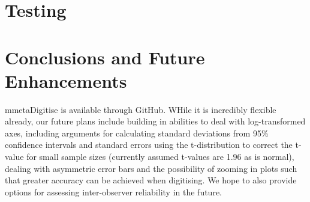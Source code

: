 \documentclass{article}
\begin{document}
\section{Testing}

\section{Conclusions and Future Enhancements}

mmetaDigitise is available through GitHub. WHile it is incredibly flexible already, our future plans include building in abilities to deal with log-transformed axes, including arguments for calculating standard deviations from 95\% confidence intervals and standard errors using the t-distribution to correct the t-value for small sample sizes (currently assumed t-values are 1.96 as is normal), dealing with asymmetric error bars and the possibility of zooming in plots such that greater accuracy can be achieved when digitising. We hope to also provide options for assessing inter-observer reliability in the future. 
\end{document}
